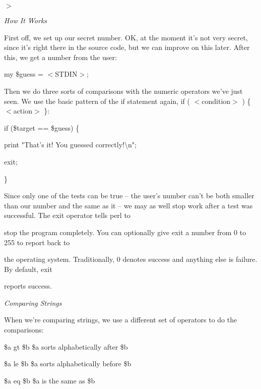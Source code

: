 \documentclass[a4paper,11pt]{book}
\begin{document}
\noindent $>$

\noindent 

\noindent \textit{How It Works}

\noindent First off, we set up our secret number. OK, at the moment it's not very secret, since it's right there in the source code, but we can improve on this later. After this, we get a number from the user:

\noindent 

\noindent 

\noindent my \$guess = $<$STDIN$>$;

\noindent 

\noindent Then we do three sorts of comparisons with the numeric operators we've just seen. We use the basic pattern of the if statement again, if ( $<$condition$>$ ) \{ $<$action$>$ \}:

\noindent 

\noindent if (\$target == \$guess) \{

\noindent print "That's it! You guessed correctly!\textbackslash n";

\noindent exit;

\noindent \}

\noindent 

\noindent Since only one of the tests can be true -- the user's number can't be both smaller than our number and the same as it -- we may as well stop work after a test was successful. The exit operator tells perl to

\noindent stop the program completely. You can optionally give exit a number from 0 to 255 to report back to

\noindent the operating system. Traditionally, 0 denotes success and anything else is failure. By default, exit

\noindent reports success.

\noindent 

\noindent \textit{Comparing Strings}

\noindent When we're comparing strings, we use a different set of operators to do the comparisons:

\noindent 

\noindent \$a gt \$b \$a sorts alphabetically after \$b

\noindent 

\noindent \$a le \$b \$a sorts alphabetically before \$b

\noindent 

\noindent \$a eq \$b \$a is the same as \$b
\end{document}
